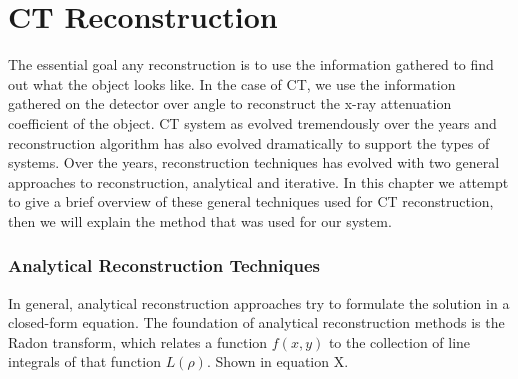 \chapter{CT Reconstruction}

The essential goal any reconstruction is to use the information gathered to find out what the object looks like.  In the case of CT, we use the information gathered on the detector over angle to reconstruct the x-ray attenuation coefficient of the object.  CT system as evolved tremendously over the years and reconstruction algorithm has also evolved dramatically to support the types of systems. Over the years, reconstruction techniques has evolved with two general approaches to reconstruction, analytical and iterative.  In this chapter we attempt to give a brief overview of these general techniques used for CT reconstruction, then we will explain the method that was used for our system.

\subsection{Analytical Reconstruction Techniques}
In general, analytical reconstruction approaches try to formulate the solution in a closed-form equation.  The foundation of analytical reconstruction methods is the Radon transform, which relates a function $f(x,y)$ to the collection of line integrals of that function $L(\rho)$.  Shown in equation X. 

\begin{equation}
\label{eq:radon}
\end{equation}

